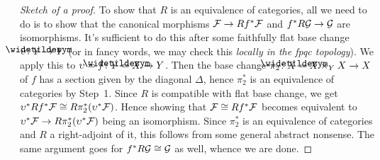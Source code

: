 \documentclass[a4paper,parskip=half,numbers=enddot, DIV=12]{scrreprt}
\begin{document}
\begin{proof}[Sketch of a proof]
	To show that $R$ is an equivalence of categories, all we need to do is to show that the canonical morphisms $\Ff\morphism Rf^*\Ff$ and $f^*R\Gg\morphism \Gg$ are isomorphisms. It's sufficient to do this after some faithfully flat base change $\upsilon\colon\snake{Y}\morphism Y$ (or in fancy words, we may check this \emph{locally in the fpqc topology}). We apply this to $\upsilon=f\colon\snake{Y}=X\morphism Y$. Then the base change $\pi_2\colon\snake{X}=X\times_YX\morphism X$ of $f$ has a section given by the diagonal $\Delta$, hence $\pi_2^*$ is an equivalence of categories by Step~1. Since $R$ is compatible with flat base change, we get $\upsilon^*Rf^*\mathcal{F}\cong R\pi_2^*(\upsilon^*\mathcal{F})$. Hence showing that $\mathcal{F}\cong Rf^*\mathcal{F}$ becomes equivalent to $\upsilon^*\Ff\morphism R\pi_2^*(\upsilon^*\Ff)$ being an isomorphism. Since $\pi_2^*$ is an equivalence of categories and $R$ a right-adjoint of it, this follows from some general abstract nonsense. The same argument goes for $f^*R\mathcal{G}\cong \mathcal{G}$ as well, whence we are done.
\end{proof}
\end{document}
